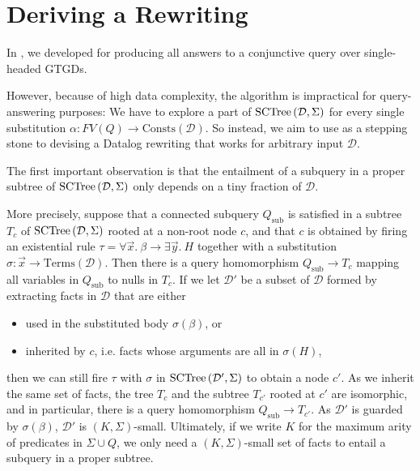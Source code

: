 \documentclass[12pt]{report}
\theoremstyle{plain}
\theoremstyle{definition}
\def\Consts{{\mathrm{Consts}}}
\def\Terms{{\mathrm{Terms}}}
\newcommand{\SCTree}[2]{\ensuremath{\normalfont{\textrm{SCTree}} \left( #1, #2 \right)}}
\begin{document}
\newpage
\chapter{Deriving a Rewriting}\label{deriving-a-rewriting}

In , we developed  for producing all answers to a conjunctive query over single-headed GTGDs.

However, because of high data complexity, the algorithm is impractical for query-answering purposes: We have to explore a part of $\SCTree{\mathcal{D}}{\Sigma}$ for every single substitution $\alpha: FV(Q) \rightarrow \Consts(\mathcal{D})$. So instead, we aim to use  as a stepping stone to devising a Datalog rewriting that works for arbitrary input $\mathcal{D}$.

The first important observation is that the entailment of a subquery in a proper subtree of $\SCTree{\mathcal{D}}{\Sigma}$ only depends on a tiny fraction of $\mathcal{D}$.

More precisely, suppose that a connected subquery $Q_\mathrm{sub}$ is satisfied in a subtree $T_c$ of $\SCTree{\mathcal{D}}{\Sigma}$ rooted at a non-root node $c$, and that $c$ is obtained by firing an existential rule $\tau = \forall \vec{x}.\ \beta \rightarrow \exists \vec{y}.\ H$ together with a substitution $\sigma: \vec{x} \rightarrow \Terms(\mathcal{D})$. Then there is a query homomorphism $Q_\mathrm{sub} \rightarrow T_c$ mapping all variables in $Q_\mathrm{sub}$ to nulls in $T_c$. If we let $\mathcal{D'}$ be a subset of $\mathcal{D}$ formed by extracting facts in $\mathcal{D}$ that are either
\begin{itemize}
  \item used in the substituted body $\sigma(\beta)$, or
  \item inherited by $c$, i.e. facts whose arguments are all in $\sigma(H)$,
\end{itemize}
then we can still fire $\tau$ with $\sigma$ in $\SCTree{\mathcal{D'}}{\Sigma}$ to obtain a node $c'$. As we inherit the same set of facts, the tree $T_c$ and the subtree $T_{c'}$ rooted at $c'$ are isomorphic, and in particular, there is a query homomorphism $Q_\mathrm{sub} \rightarrow T_{c'}$. As $\mathcal{D'}$ is guarded by $\sigma(\beta)$, $\mathcal{D'}$ is $(K, \Sigma)$-small. Ultimately, if we write $K$ for the maximum arity of predicates in $\Sigma \cup Q$, we only need a $(K, \Sigma)$-small set of facts to entail a subquery in a proper subtree.
\end{document}
